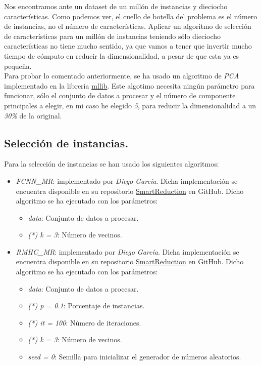 \documentclass[11pt]{article}
\begin{document}
Nos encontramos ante un dataset de un millón de instancias y dieciocho características. Como podemos ver, el cuello de botella del problema es el número de instancias, no el número de características. Aplicar un algoritmo de selección de características para un millón de instancias teniendo sólo dieciocho características no tiene mucho sentido, ya que vamos a tener que invertir mucho tiempo de cómputo en reducir la dimensionalidad, a pesar de que esta ya es pequeña. \\

Para probar lo comentado anteriormente, se ha usado un algoritmo de \textit{PCA} implementado en la librería \href{https://spark.apache.org/docs/2.2.0/api/scala/index.html#org.apache.spark.ml.feature.PCA}{mllib}. Este algotimo necesita ningún parámetro para funcionar, sólo el conjunto de datos a procesar y el número de componente principales a elegir, en mi caso he elegido \textit{5}, para reducir la dimensionalidad a un \textit{30\%} de la original.

\subsection{Selección de instancias.}

Para la selección de instancias se han usado los siguientes algoritmos:

\begin{itemize}
	\item \textit{FCNN\_MR}: implementado por \textit{Diego García}. Dicha implementación se encuentra disponible en su repositorio \href{https://github.com/djgarcia/SmartReduction}{SmartReduction} en GitHub. Dicho algoritmo se ha ejecutado con los parámetros:
	
	\begin{itemize}
		\item \textit{data}: Conjunto de datos a procesar.
		\item \textit{(*) k = 3}: Número de vecinos.
	\end{itemize}

	\item \textit{RMHC\_MR}: implementado por \textit{Diego García}. Dicha implementación se encuentra disponible en su repositorio \href{https://github.com/djgarcia/SmartReduction}{SmartReduction} en GitHub. Dicho algoritmo se ha ejecutado con los parámetros:
	
	\begin{itemize}
		\item \textit{data}: Conjunto de datos a procesar.
		\item \textit{(*) p = 0.1}: Porcentaje de instancias.
		\item \textit{(*) it = 100}: Número de iteraciones.
		\item \textit{(*) k = 3}: Número de vecinos.
		\item \textit{seed = 0}: Semilla para inicializar el generador de números aleatorios.
	\end{itemize}
\end{itemize}
\end{document}

